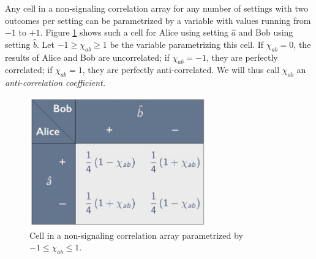 Any cell in a non-signaling correlation array for any number of settings with two outcomes per setting can be parametrized by a variable with values running from $-1$ to $+1$. Figure  \ref{CA-2set2out-cell} shows such a cell for Alice using setting $\hat{a}$ and Bob using setting $\hat{b}$. Let $-1 \ge \chi_{ab} \ge 1$ be the variable parametrizing this cell. If $\chi_{ab} = 0$, the results of Alice and Bob are uncorrelated; if $\chi_{ab} =-1$, they are perfectly correlated; if $\chi_{ab} =1$, they are perfectly anti-correlated. We will thus call $\chi_{ab}$ an \emph{anti-correlation coefficient.}
\begin{figure}[h]
\centering
    \includegraphics[width=3in]{CA-2set2out-cell.jpeg}
 \caption{Cell in a non-signaling correlation array parametrized by $-1 \le \chi_{ab} \le 1$.}
   \label{CA-2set2out-cell}
\end{figure}

